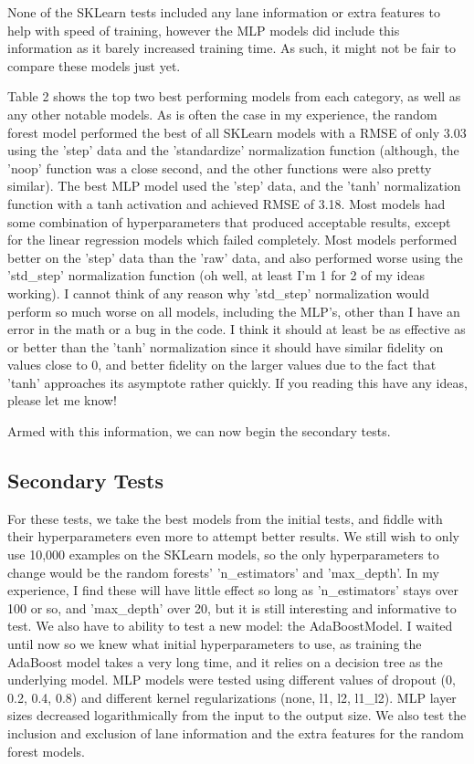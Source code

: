 \documentclass{article}
\begin{document}
None of the SKLearn tests included any lane information or extra features to help with speed of training, however the MLP models did include this information as it barely increased training time. As such, it might not be fair to compare these models just yet. 

Table 2 shows the top two best performing models from each category, as well as any other notable models. As is often the case in my experience, the random forest model performed the best of all SKLearn models with a RMSE of only 3.03 using the 'step' data and the 'standardize' normalization function (although, the 'noop' function was a close second, and the other functions were also pretty similar). The best MLP model used the 'step' data, and the 'tanh' normalization function with a tanh activation and achieved RMSE of 3.18. Most models had some combination of hyperparameters that produced acceptable results, except for the linear regression models which failed completely. Most models performed better on the 'step' data than the 'raw' data, and also performed worse using the 'std\_step' normalization function (oh well, at least I'm 1 for 2 of my ideas working). I cannot think of any reason why 'std\_step' normalization would perform so much worse on all models, including the MLP's, other than I have an error in the math or a bug in the code. I think it should at least be as effective as or better than the 'tanh' normalization since it should have similar fidelity on values close to 0, and better fidelity on the larger values due to the fact that 'tanh' approaches its asymptote rather quickly. If you reading this have any ideas, please let me know!

Armed with this information, we can now begin the secondary tests.

\subsection{Secondary Tests}

For these tests, we take the best models from the initial tests, and fiddle with their hyperparameters even more to attempt better results. We still wish to only use 10,000 examples on the SKLearn models, so the only hyperparameters to change would be the random forests' 'n\_estimators' and 'max\_depth'. In my experience, I find these will have little effect so long as 'n\_estimators' stays over 100 or so, and 'max\_depth' over 20, but it is still interesting and informative to test. We also have to ability to test a new model: the AdaBoostModel. I waited until now so we knew what initial hyperparameters to use, as training the AdaBoost model takes a very long time, and it relies on a decision tree as the underlying model. MLP models were tested using different values of dropout (0, 0.2, 0.4, 0.8) and different kernel regularizations (none, l1, l2, l1\_l2). MLP layer sizes decreased logarithmically from the input to the output size. We also test the inclusion and exclusion of lane information and the extra features for the random forest models.
\end{document}
